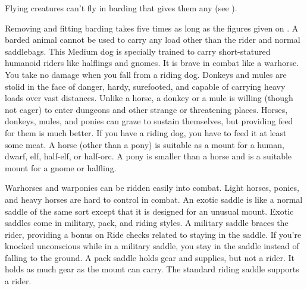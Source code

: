         \par Flying creatures can't fly in barding that gives them any  (see ).
        \par Removing and fitting barding takes five times as long as the figures given on . A barded animal cannot be used to carry any load other than the rider and normal saddlebags.
         This Medium dog is specially trained to carry short-statured humanoid riders like halflings and gnomes. It is brave in combat like a warhorse. You take no damage when you fall from a riding dog.
         Donkeys and mules are stolid in the face of danger, hardy, surefooted, and capable of carrying heavy loads over vast distances. Unlike a horse, a donkey or a mule is willing (though not eager) to enter dungeons and other strange or threatening places.
         Horses, donkeys, mules, and ponies can graze to sustain themselves, but providing feed for them is much better. If you have a riding dog, you have to feed it at least some meat.
         A horse (other than a pony) is suitable as a mount for a human, dwarf, elf, half-elf, or half-orc. A pony is smaller than a horse and is a suitable mount for a gnome or halfling.
        \par Warhorses and warponies can be ridden easily into combat. Light horses, ponies, and heavy horses are hard to control in combat.
         An exotic saddle is like a normal saddle of the same sort except that it is designed for an unusual mount. Exotic saddles come in military, pack, and riding styles.
         A military saddle braces the rider, providing a  bonus on Ride checks related to staying in the saddle. If you're knocked unconscious while in a military saddle, you stay in the saddle instead of falling to the ground.
         A pack saddle holds gear and supplies, but not a rider. It holds as much gear as the mount can carry.
         The standard riding saddle supports a rider.

